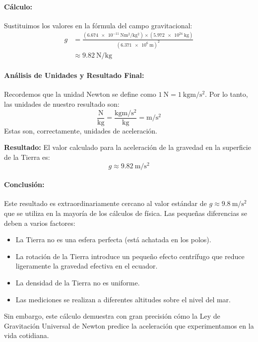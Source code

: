 \documentclass[11pt,a4paper]{book}
\begin{document}
\paragraph{Cálculo:}
Sustituimos los valores en la fórmula del campo gravitacional:
\begin{align*}
    g &= \frac{(\SI{6.674e-11}{\newton\meter\squared\per\kilo\gram\squared}) \times (\SI{5.972e24}{\kilo\gram})}{(\SI{6.371e6}{\meter})^2} \\
      &\approx \SI{9.82}{\newton\per\kilo\gram}
\end{align*}

\paragraph{Análisis de Unidades y Resultado Final:}
Recordemos que la unidad Newton se define como $\SI{1}{\newton} = \SI{1}{\kilo\gram\meter\per\second\squared}$. Por lo tanto, las unidades de nuestro resultado son:
\[ \frac{\si{\newton}}{\si{\kilo\gram}} = \frac{\si{\kilo\gram\meter\per\second\squared}}{\si{\kilo\gram}} = \si{\meter\per\second\squared} \]
Estas son, correctamente, unidades de aceleración.

\vspace{1em}
\noindent \textbf{Resultado:}
El valor calculado para la aceleración de la gravedad en la superficie de la Tierra es:
\[ \boxed{g \approx \SI{9.82}{\meter\per\second\squared}} \]

\paragraph{Conclusión:}
Este resultado es extraordinariamente cercano al valor estándar de $g \approx \SI{9.8}{\meter\per\second\squared}$ que se utiliza en la mayoría de los cálculos de física. Las pequeñas diferencias se deben a varios factores:
\begin{itemize}
    \item La Tierra no es una esfera perfecta (está achatada en los polos).
    \item La rotación de la Tierra introduce un pequeño efecto centrífugo que reduce ligeramente la gravedad efectiva en el ecuador.
    \item La densidad de la Tierra no es uniforme.
    \item Las mediciones se realizan a diferentes altitudes sobre el nivel del mar.
\end{itemize}
Sin embargo, este cálculo demuestra con gran precisión cómo la Ley de Gravitación Universal de Newton predice la aceleración que experimentamos en la vida cotidiana.
\end{document}
